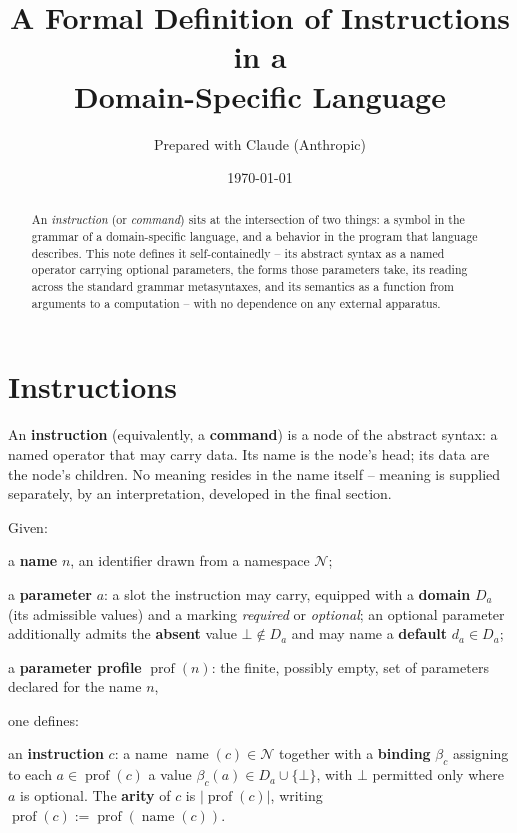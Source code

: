 \documentclass[11pt]{article}
\title{A Formal Definition of Instructions in a\\[2pt]
       Domain-Specific Language}
\author{Prepared with Claude (Anthropic)}
\date{\today}
\begin{document}
\maketitle

\begin{abstract}
An \emph{instruction} (or \emph{command}) sits at the intersection of two things:
a symbol in the grammar of a domain-specific language, and a behavior in the
program that language describes. This note defines it self-containedly -- its
abstract syntax as a named operator carrying optional parameters, the forms those
parameters take, its reading across the standard grammar metasyntaxes, and its
semantics as a function from arguments to a computation -- with no dependence on
any external apparatus.
\end{abstract}

\section*{Instructions}

An \textbf{instruction} (equivalently, a \textbf{command}) is a node of the
abstract syntax: a named operator that may carry data. Its name is the node's
head; its data are the node's children. No meaning resides in the name itself --
meaning is supplied separately, by an interpretation, developed in the final
section.

Given:

\begin{definitionlist}
    \item a \textbf{name} \(n\), an identifier drawn from a namespace
          \(\mathcal{N}\);
    \item a \textbf{parameter} \(a\): a slot the instruction may carry, equipped
          with a \textbf{domain} \(D_a\) (its admissible values) and a marking
          \emph{required} or \emph{optional}; an optional parameter additionally
          admits the \textbf{absent} value \(\bot \notin D_a\) and may name a
          \textbf{default} \(d_a \in D_a\);
    \item a \textbf{parameter profile} \(\operatorname{prof}(n)\): the finite,
          possibly empty, set of parameters declared for the name \(n\),
\end{definitionlist}

one defines:

\begin{definitionlist}[start=4]
    \item an \textbf{instruction} \(c\): a name \(\operatorname{name}(c)\in
          \mathcal{N}\) together with a \textbf{binding} \(\beta_c\) assigning to
          each \(a\in\operatorname{prof}(c)\) a value \(\beta_c(a)\in
          D_a\cup\{\bot\}\), with \(\bot\) permitted only where \(a\) is
          optional. The \textbf{arity} of \(c\) is
          \(\lvert\operatorname{prof}(c)\rvert\), writing
          \(\operatorname{prof}(c):=\operatorname{prof}(\operatorname{name}(c))\).
\end{definitionlist}
\end{document}
